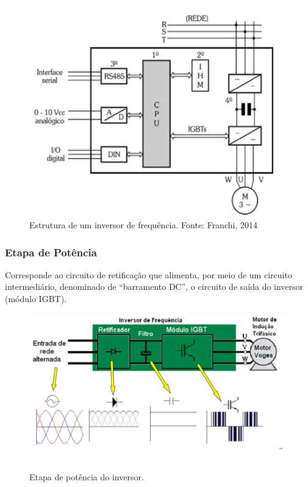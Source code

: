 \documentclass[a4paper, 12pt,oneside, english, brazil]{abntex2}
\begin{document}
\begin{figure}[H]
    \centering
    \includegraphics[scale=0.8]{estru.png}
    \caption{Estrutura de um inversor de frequência. Fonte: Franchi, 2014}
    \label{estru}
\end{figure}

\subsubsection{ Etapa de Potência}
Corresponde ao circuito de retificação que alimenta, por meio de um circuito intermediário, denominado de “barramento DC”, o circuito de saída do inversor (módulo IGBT).

\begin{figure}[H]
    \centering
    \includegraphics[scale=0.8]{aaa.png}
    \caption{Etapa de potência do inversor.}
    \label{aaa}
\end{figure}
\end{document}
